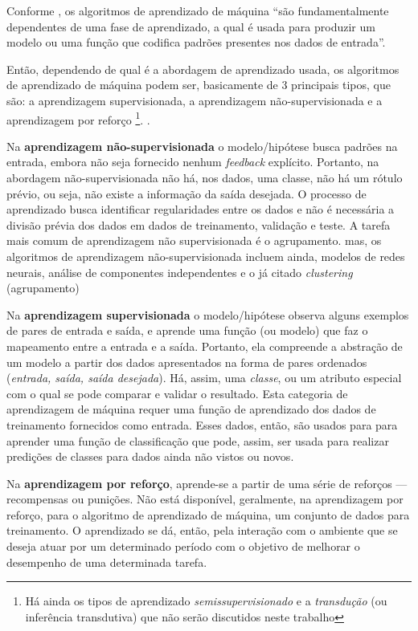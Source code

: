 Conforme \cite[p. 279]{baeza-yates_recuperacao_2013}, os algoritmos de aprendizado de máquina ``são fundamentalmente dependentes de uma fase de aprendizado, a qual é usada para produzir um modelo ou uma função que codifica padrões presentes nos dados de entrada''.

Então, dependendo de qual é a abordagem de aprendizado usada, os algoritmos de aprendizado de máquina podem ser, basicamente de 3 principais tipos, que são: a aprendizagem supervisionada, a aprendizagem não-supervisionada e a aprendizagem por reforço \footnote{Há ainda os tipos de aprendizado \textit{semissupervisionado} e a \textit{transdução} (ou inferência transdutiva) que não serão discutidos neste trabalho}. \cite{Norvig2013} \cite{baeza-yates_recuperacao_2013}. 

Na \textbf{aprendizagem não-supervisionada} o modelo/hipótese busca padrões na entrada, embora não seja fornecido nenhum \textit{feedback} explícito. Portanto, na abordagem não-supervisionada não há, nos dados, uma classe, não há um rótulo prévio, ou seja, não existe a informação da saída desejada. O processo de aprendizado busca identificar regularidades entre os dados e não é necessária a divisão prévia dos dados em dados de treinamento, validação e teste.  A tarefa mais comum de aprendizagem não supervisionada é o agrupamento. mas, os algoritmos de aprendizagem não-supervisionada incluem ainda, modelos de redes neurais, análise de componentes independentes e o já citado \textit{clustering} (agrupamento) \cite{Norvig2013} \cite{Boscarioli2017} \cite{goldschmidt2005} \cite{aprenda_mineracao_fernando_amaral16}

Na \textbf{aprendizagem supervisionada} o modelo/hipótese observa alguns exemplos de pares de entrada e saída, e aprende uma função (ou modelo) que faz o mapeamento entre a entrada e a saída. Portanto, ela compreende a abstração de um modelo a partir dos dados apresentados na forma de pares ordenados (\textit{entrada, saída, saída desejada}). Há, assim, uma \textit{classe}, ou um atributo especial com o qual se pode comparar e validar o resultado. Esta categoria de aprendizagem de máquina requer uma função de aprendizado dos dados de treinamento fornecidos como entrada. Esses dados, então, são usados para para aprender uma função de classificação que pode, assim, ser usada para realizar predições de classes para dados ainda não vistos ou novos. \cite{Norvig2013} \cite{luger_inteligencia_2015} \cite{baeza-yates_recuperacao_2013}

Na \textbf{aprendizagem por reforço}, aprende-se a partir de uma série de reforços --- recompensas ou punições. Não está disponível, geralmente, na aprendizagem por reforço, para o algoritmo de aprendizado de máquina, um conjunto de dados para treinamento. O aprendizado se dá, então, pela interação com o ambiente que se deseja atuar por um determinado período com o objetivo de melhorar o desempenho de uma determinada tarefa. \cite{Norvig2013} \cite{aprenda_mineracao_fernando_amaral16} \cite{silva_restaurante_2019}	

